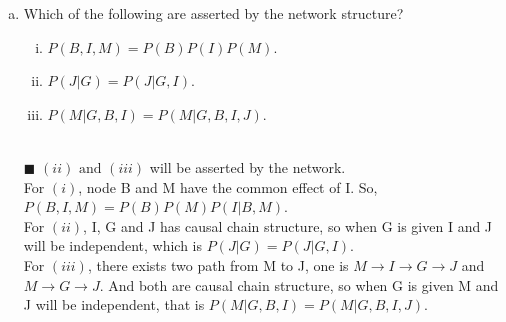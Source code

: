 \documentclass{article}
\newcommand{\solution}[1]{~\\ $\blacksquare$ \sffamily\upshape\selectfont #1
\normalfont ~\\~ }
\begin{document}
\begin{enumerate}[a.]
\item Which of the following are asserted by the network structure?
\begin{enumerate}[i.]
\item $ P(B,I,M)=P(B)P(I)P(M) $.
\item $ P(J|G)=P(J|G,I) $.
\item $ P(M|G,B,I)=P(M|G,B,I,J) $. 
\end{enumerate}
\solution{$(ii) \mbox{ and } (iii) $ will be asserted by the network. \\
  For $(i)$, node B and M have the common effect of I. So, $P(B,I,M) =
  P(B)P(M)P(I|B,M)$. \\
  For $(ii)$, I, G and J has causal chain structure, so when G is given
  I and J will be independent, which is $P(J|G)=P(J|G,I)$. \\ 
  For $(iii)$, there exists two path from M to J, one is $M\rightarrow
  I\rightarrow G\rightarrow J$ and $M\rightarrow G\rightarrow J$. And
  both are causal chain structure, so when G is given M and J will be
  independent, that is $P(M|G,B,I)=P(M|G,B,I,J)$.
}


\end{enumerate}
\end{document}
